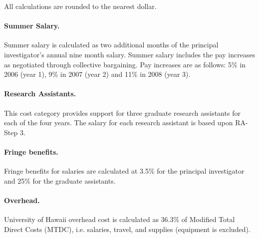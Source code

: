\documentclass[11pt]{article}
\begin{document}
All calculations are rounded to the nearest dollar.

\paragraph{Summer Salary.}  
Summer salary is calculated as two additional months of the principal
investigator's annual nine month salary.  Summer salary includes the pay
increases as negotiated through collective bargaining.  Pay increases are
as follows: 5\% in 2006 (year 1), 9\% in 2007 (year 2) and 11\% in 2008
(year 3).
 

\paragraph*{Research Assistants.}  
This cost category provides support for three graduate research assistants
for each of the four years.  The salary for each research assistant is
based upon RA-Step 3.

\paragraph*{Fringe benefits.} 
Fringe benefits for salaries are calculated at 3.5\% for the principal
investigator and 25\% for the graduate assistants.

\paragraph*{Overhead.}  
University of Hawaii overhead cost is calculated as 36.3\% of Modified Total
Direct Costs (MTDC), i.e. salaries, travel, and supplies (equipment is
excluded).
\end{document}

